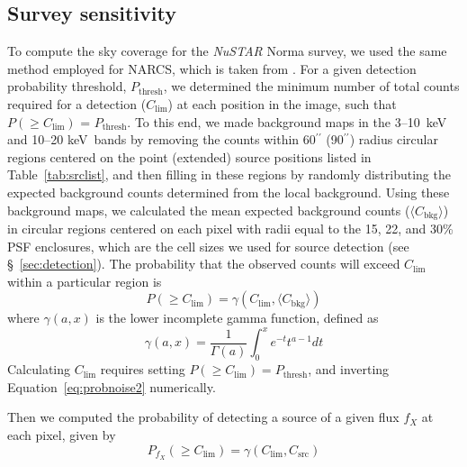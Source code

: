 \documentclass[iop,revtex4]{emulateapj}
\begin{document}
\subsection{Survey sensitivity}
\label{sec:sensitivity}
To compute the sky coverage for the \textit{NuSTAR} Norma survey, we used the same method employed for NARCS, which is taken from \citet{georgakakis08}.  For a given detection probability threshold, $P_{\mathrm{thresh}}$, we determined the minimum number of total counts required for a detection ($C_{\mathrm{lim}}$) at each position in the image, such that $P(\geq C_{\mathrm{lim}})$ = $P_{\mathrm{thresh}}$.  To this end, we made background maps in the 3--10~keV and 10--20 keV~bands by removing the counts within 60$^{\prime\prime}$ (90$^{\prime\prime}$) radius circular regions centered on the point (extended) source positions listed in Table~\ref{tab:srclist}, and then filling in these regions by randomly distributing the expected background counts determined from the local background.  Using these background maps, we calculated the mean expected background counts ($\langle C_{\mathrm{bkg}}\rangle$) in circular regions centered on each pixel with radii equal to the 15, 22, and 30\% PSF enclosures, which are the cell sizes we used for source detection (see \S~\ref{sec:detection}).  The probability that the observed counts will exceed $C_{\mathrm{lim}}$ within a particular region is
\begin{equation}
P(\geq C_{\mathrm{lim}}) = \gamma(C_{\mathrm{lim}}, \langle C_{\mathrm{bkg}}\rangle)
\label{eq:probnoise2}
\end{equation}
where $\gamma(a,x)$ is the lower incomplete gamma function, defined as
\begin{equation}
\gamma(a,x) = \frac{1}{\Gamma(a)}\int_0^x e^{-t}t^{a-1}dt  
\end{equation}
Calculating $C_{\mathrm{lim}}$ requires setting $P(\geq C_{\mathrm{lim}}) = P_{\mathrm{thresh}}$, and inverting Equation~\ref{eq:probnoise2} numerically.  \par
Then we computed the probability of detecting a source of a given flux $f_X$ at each pixel, given by
\begin{equation}
P_{f_X}(\geq C_{\mathrm{lim}}) = \gamma(C_{\mathrm{lim}},C_{\mathrm{src}}) 
\label{eq:probfx}
\end{equation}
\end{document}
